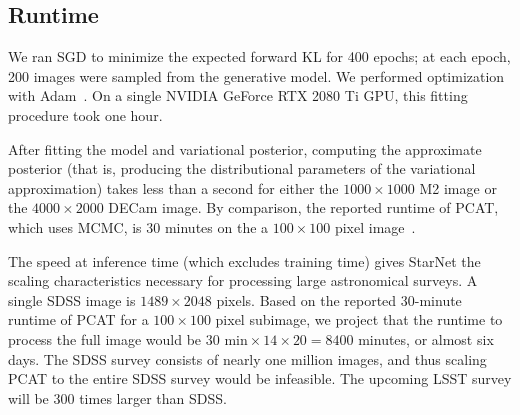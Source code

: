 




\subsection{Runtime}
\label{sec:runtime}
We ran SGD to minimize the expected forward KL
for 400 epochs; at each epoch, 200 images were sampled from the generative model.
We performed optimization with Adam~\citep{kingma2014adam}.
On a single NVIDIA GeForce RTX 2080 Ti GPU,
this fitting procedure took one hour.

After fitting the model and variational posterior,
computing the approximate posterior
(that is, producing the distributional parameters of the variational approximation) takes less than a second for either the $1000\times1000$ M2 image
or the $4000 \times 2000$ DECam image. 
By comparison, the reported runtime of PCAT, which uses MCMC, is 30 minutes on the a $100 \times 100$ pixel image~\citep{Feder_2019}.

The speed at inference time (which excludes training time) gives StarNet the scaling characteristics necessary for processing large astronomical surveys.
A single SDSS image is $1489 \times 2048$ pixels.
Based on the reported 30-minute runtime of PCAT for a $100\times100$ pixel subimage, we project that
the runtime to process the full image would be $30\text{ min} \times 14 \times 20 = 8400$ minutes, or almost six days.
The SDSS survey consists of nearly one million images, and thus scaling PCAT to the entire SDSS survey would be infeasible.
The upcoming LSST survey will be 300 times larger than SDSS.



